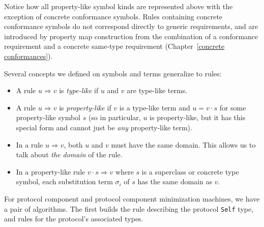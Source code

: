 \documentclass[../generics]{subfiles}
\begin{document}
Notice how all property-like symbol kinds are represented above with the exception of concrete conformance symbols. Rules containing concrete conformance symbols do not correspond directly to generic requirements, and are introduced by property map construction from the combination of a conformance requirement and a concrete same-type requirement (Chapter~\ref{concrete conformances}).
\begin{definition}\label{type like rule}
Several concepts we defined on symbols and terms generalize to rules:
\begin{itemize}
%
\item A rule $u\Rightarrow v$ is \emph{type-like} if $u$ and $v$ are type-like terms.
%
\item A rule $u\Rightarrow v$ is \emph{property-like} if $v$ is a type-like term and $u=v\cdot s$ for some property-like symbol $s$ (so in particular, $u$ is property-like, but it has this special form and cannot just be \emph{any} property-like term).
%
\item In a rule $u\Rightarrow v$, both $u$ and $v$ must have the same domain. This allows us to talk about \emph{the domain} of the rule.
\item In a property-like rule $v\cdot s\Rightarrow v$ where $s$ is a superclass or concrete type symbol, each substitution term $\sigma_i$ of $s$ has the same domain as $v$.
\end{itemize}
\end{definition}
For protocol component and protocol component minimization machines, we have a pair of algorithms. The first builds the rule describing the protocol \texttt{Self} type, and rules for the protocol's associated types.
\end{document}
